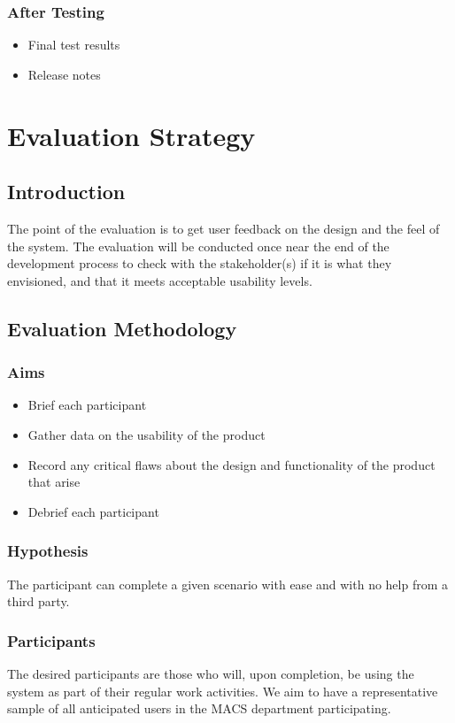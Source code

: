 \documentclass[11pt, a4paper]{article}
\begin{document}
\subsubsection*{After Testing}
\begin{itemize}
    \item Final test results
    \item Release notes
\end{itemize}

\section{Evaluation Strategy}
\subsection{Introduction}
The point of the evaluation is to get user feedback on the design and the feel of the system. The evaluation will be conducted once near the end of the development process to check with the stakeholder(s) if it is what they envisioned, and that it meets acceptable usability levels.

\subsection{Evaluation Methodology}
\subsubsection{Aims}
\begin{itemize}
    \item Brief each participant
    \item Gather data on the usability of the product
    \item Record any critical flaws about the design and functionality of the product that arise 
    \item Debrief each participant
\end{itemize}
\subsubsection{Hypothesis}
The participant can complete a given scenario with ease and with no help from a third party.
\subsubsection{Participants}
The desired participants are those who will, upon completion, be using the system as part of their regular work activities. We aim to have a representative sample of all anticipated users in the MACS department participating.
\end{document}
